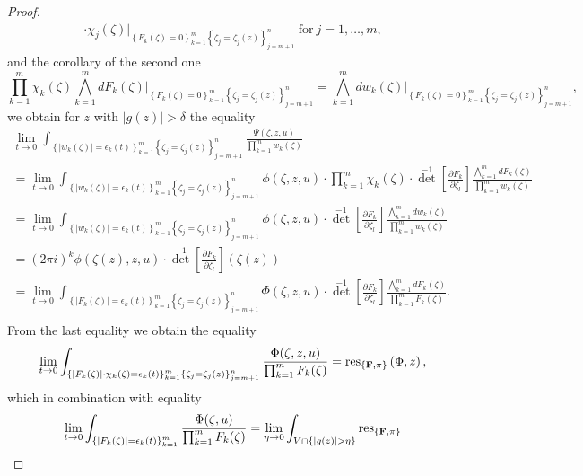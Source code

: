 \documentclass[11pt,reqno]{amsart}
\numberwithin{equation}{section}
\begin{document}
\begin{proof}
\begin{multline*}
\cdot\chi_j(\zeta)\Bigg|_{\left\{F_k(\zeta)=0\right\}_{k=1}^m
\left\{\zeta_j=\zeta_j(z)\right\}_{j=m+1}^n}\ \text{for}\ j=1,\dots,m,
\end{multline*}
and the corollary of the second one
$$\prod_{k=1}^m\chi_k(\zeta)\bigwedge_{k=1}^m dF_k(\zeta)
\Bigg|_{\left\{F_k(\zeta)=0\right\}_{k=1}^m\left\{\zeta_j=\zeta_j(z)\right\}_{j=m+1}^n}
=\bigwedge_{k=1}^m dw_k(\zeta)
\Bigg|_{\left\{F_k(\zeta)=0\right\}_{k=1}^m\left\{\zeta_j=\zeta_j(z)\right\}_{j=m+1}^n},$$
we obtain for $z$ with $|g(z)|>\delta$ the equality
\begin{multline*}
\lim_{t\to 0}\int_{\left\{|w_k(\zeta)|=\epsilon_k(t)\right\}_{k=1}^m
\left\{\zeta_j=\zeta_j(z)\right\}_{j=m+1}^n}
\frac{\Psi(\zeta,z,u)}{\prod_{k=1}^m w_k(\zeta)}\\
=\lim_{t\to 0}\int_{\left\{|w_k(\zeta)|=\epsilon_k(t)\right\}_{k=1}^m
\left\{\zeta_j=\zeta_j(z)\right\}_{j=m+1}^n}
\phi(\zeta,z,u)\cdot\prod_{k=1}^m\chi_k(\zeta)
\cdot{\det}^{-1}\left[\frac{\partial F_k}{\partial\zeta_l}\right]
\frac{\bigwedge_{k=1}^m dF_k(\zeta)}{\prod_{k=1}^m w_k(\zeta)}\\
=\lim_{t\to 0}\int_{\left\{|w_k(\zeta)|=\epsilon_k(t)\right\}_{k=1}^m
\left\{\zeta_j=\zeta_j(z)\right\}_{j=m+1}^n}
\phi(\zeta,z,u)\cdot{\det}^{-1}\left[\frac{\partial F_k}{\partial\zeta_l}\right]
\frac{\bigwedge_{k=1}^m dw_k(\zeta)}{\prod_{k=1}^m w_k(\zeta)}\\
=(2\pi i)^k\phi(\zeta(z),z,u)\cdot{\det}^{-1}\left[\frac{\partial F_k}{\partial\zeta_l}\right]
\left(\zeta(z)\right)\\
=\lim_{t\to 0}\int_{\left\{|F_k(\zeta)|=\epsilon_k(t)\right\}_{k=1}^m
\left\{\zeta_j=\zeta_j(z)\right\}_{j=m+1}^n}
\Phi(\zeta,z,u)\cdot{\det}^{-1}\left[\frac{\partial F_k}{\partial\zeta_l}\right]
\frac{\bigwedge_{k=1}^m dF_k(\zeta)}{\prod_{k=1}^m F_k(\zeta)}.\\
\end{multline*}
\indent
From the last equality we obtain the equality
\begin{equation*}
\lim_{t\to 0}\int_{\left\{|F_k(\zeta)|\cdot\chi_k(\zeta)=\epsilon_k(t)\right\}_{k=1}^m
\left\{\zeta_j=\zeta_j(z)\right\}_{j=m+1}^n}
\frac{\Phi(\zeta,z,u)}{\prod_{k=1}^m F_k(\zeta)}
=\mbox{res}_{\{{\bf F},\pi\}}\left(\Phi,z\right),
\end{equation*}
which in combination with equality
\begin{equation}\label{FiberedEquality}
\lim_{t\to 0}\int_{\left\{|F_k(\zeta)|=\epsilon_k(t)\right\}_{k=1}^m}
\frac{\Phi(\zeta,u)}{\prod_{k=1}^m F_k(\zeta)}
=\lim_{\eta\to 0}\int_{V\cap\{|g(z)|>\eta\}}\mbox{res}_{\{{\bf F},\pi\}}

\end{equation}
\end{proof}
\end{document}
